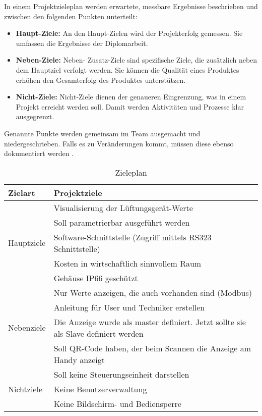 In einem Projektzieleplan werden erwartete, messbare Ergebnisse beschrieben und zwischen den folgenden Punkten unterteilt:
\begin{itemize}
	\item \textbf{Haupt-Ziele:} An den Haupt-Zielen wird der  Projekterfolg gemessen. Sie umfassen die Ergebnisse der Diplomarbeit.
	\item \textbf{Neben-Ziele:} Neben- \bzw Zusatz-Ziele sind spezifische Ziele, die zusätzlich neben dem Hauptziel verfolgt werden. Sie können die Qualität eines Produktes erhöhen \bzw den Gesamterfolg des Produktes unterstützen.
	\item \textbf{Nicht-Ziele:} Nicht-Ziele dienen der genaueren Eingrenzung, was in einem Projekt erreicht werden soll. Damit werden Aktivitäten und Prozesse klar ausgegrenzt.
\end{itemize}
Genannte Punkte werden gemeinsam im Team ausgemacht und niedergeschrieben. Falls es zu Veränderungen kommt, müssen diese ebenso dokumentiert werden \cite[vgl.][]{diplomarbeiten-bbs:o.J.}.


\begin{table}[htpb]
	\caption{Zieleplan}
	\label{tab:ziele_plan}
	\begin{tabular}{p{} | p{}}
		\toprule
		\textbf{Zielart} & \textbf{Projektziele} \\
		\midrule
		& Visualisierung der Lüftungsgerät-Werte
		\\
		& Soll parametrierbar ausgeführt werden
		\\
		Hauptziele & Software-Schnittstelle (Zugriff mittels RS323 Schnittstelle)
		\\
		& Kosten in wirtschaftlich sinnvollem Raum
		\\
		& Gehäuse IP66 geschützt 
		\\
		\midrule
		& Nur Werte anzeigen, die auch vorhanden sind (Modbus)
		\\
		& Anleitung für User und Techniker erstellen
		\\
		Nebenziele & Die Anzeige wurde als master definiert. Jetzt sollte sie als Slave definiert werden
		\\
		& Soll QR-Code haben, der beim Scannen die Anzeige am Handy anzeigt
		\\
		\midrule
		& Soll keine Steuerungseinheit darstellen
		\\
		Nichtziele & Keine Benutzerverwaltung
		\\
		& Keine Bildschirm- und Bediensperre
		\\
		\bottomrule
	\end{tabular}
\end{table}